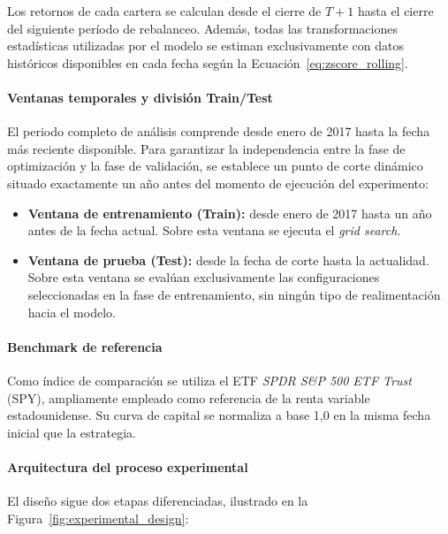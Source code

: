 Los retornos de cada cartera se calculan desde el cierre de
$T+1$ hasta el cierre del siguiente período de rebalanceo.
Además, todas las transformaciones estadísticas utilizadas por
el modelo se estiman
exclusivamente con datos históricos disponibles en cada fecha
según la Ecuación~\ref{eq:zscore_rolling}.

\paragraph{Ventanas temporales y división Train/Test}

El periodo completo de análisis comprende desde enero de 2017
hasta la fecha más reciente disponible. Para garantizar la
independencia entre la fase de optimización y la fase de
validación, se establece un punto de corte dinámico situado
exactamente un año antes del momento de ejecución del
experimento:

\begin{itemize}
    \item \textbf{Ventana de entrenamiento (Train):}
    desde enero de 2017 hasta un año antes de la fecha actual.
    Sobre esta ventana se ejecuta el \textit{grid search}.
    \item \textbf{Ventana de prueba (Test):}
    desde la fecha de corte hasta la actualidad. Sobre esta
    ventana se evalúan exclusivamente las configuraciones
    seleccionadas en la fase de entrenamiento, sin ningún tipo
    de realimentación hacia el modelo.
\end{itemize}

\paragraph{Benchmark de referencia}

Como índice de comparación se utiliza el ETF \textit{SPDR
S\&P 500 ETF Trust} (SPY), ampliamente empleado como referencia de la renta variable estadounidense. Su curva de
capital se normaliza a base 1,0 en la misma fecha inicial que la
estrategia.

\paragraph{Arquitectura del proceso experimental}

El diseño sigue dos etapas diferenciadas, ilustrado en la
Figura~\ref{fig:experimental_design}:

